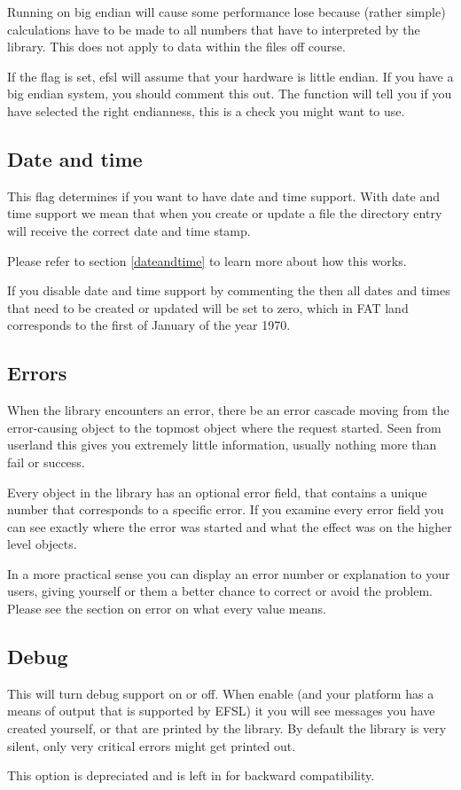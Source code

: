 Running on big endian will cause some performance lose because (rather simple) calculations have
to be made to all numbers that have to interpreted by the library. This does not apply to
data within the files off course.

If the flag  is set, efsl will assume that your hardware is little endian.
If you have a big endian system, you should comment this out. The function 
will tell you if you have selected the right endianness, this is a check you might want to use.

\subsection{Date and time}
This flag determines if you want to have date and time support. With date and time support we
mean that when you create or update a file the directory entry will receive the correct date and
time stamp.

Please refer to section \ref{dateandtime} to learn more about how this works.

If you disable date and time support by commenting the  then
all dates and times that need to be created or updated will be set to zero, which in FAT land corresponds to the first of January of the year 1970.

\subsection{Errors}
When the library encounters an error, there be an error cascade moving from the error-causing object
to the topmost object where the request started. Seen from userland this gives you extremely little
information, usually nothing more than fail or success.

Every object in the library has an optional error field, that contains a unique number that
corresponds to a specific error. If you examine every error field you can see exactly where the
error was started and what the effect was on the higher level objects.

In a more practical sense you can display an error number or explanation to your users, giving
yourself or them a better chance to correct or avoid the problem.
Please see the section on error on what every value means.

\subsection{Debug}
This will turn debug support on or off. When enable (and your platform has a means of output that
is supported by EFSL) it you will see messages you have created yourself, or that are printed by the
library. By default the library is very silent, only very critical errors might get printed out.

This option is depreciated and is left in for backward compatibility.
